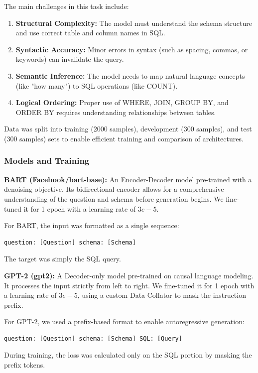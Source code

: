 The main challenges in this task include:
\begin{enumerate}
    \item \textbf{Structural Complexity:} The model must understand the schema structure and use correct table and column names in SQL.
    \item \textbf{Syntactic Accuracy:} Minor errors in syntax (such as spacing, commas, or keywords) can invalidate the query.
    \item \textbf{Semantic Inference:} The model needs to map natural language concepts (like "how many") to SQL operations (like COUNT).
    \item \textbf{Logical Ordering:} Proper use of WHERE, JOIN, GROUP BY, and ORDER BY requires understanding relationships between tables.
\end{enumerate}

Data was split into training (2000 samples), development (300 samples), and test (300 samples) sets to enable efficient training and comparison of architectures.

\subsubsection{Models and Training}
\textbf{BART (Facebook/bart-base):} An Encoder-Decoder model pre-trained with a denoising objective. Its bidirectional encoder allows for a comprehensive understanding of the question and schema before generation begins. We fine-tuned it for 1 epoch with a learning rate of $3e-5$.

For BART, the input was formatted as a single sequence:
\begin{lstlisting}
question: [Question] schema: [Schema]
\end{lstlisting}
The target was simply the SQL query.

\textbf{GPT-2 (gpt2):} A Decoder-only model pre-trained on causal language modeling. It processes the input strictly from left to right. We fine-tuned it for 1 epoch with a learning rate of $3e-5$, using a custom Data Collator to mask the instruction prefix.

For GPT-2, we used a prefix-based format to enable autoregressive generation:
\begin{lstlisting}
question: [Question] schema: [Schema] SQL: [Query]
\end{lstlisting}
During training, the loss was calculated only on the SQL portion by masking the prefix tokens.

